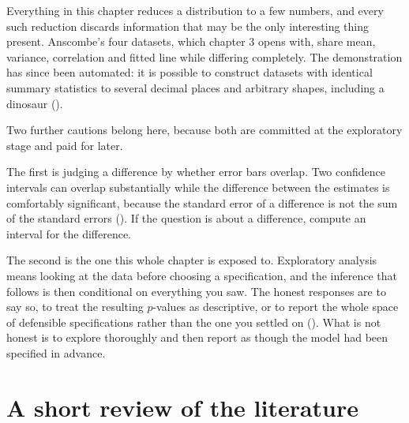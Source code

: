 \documentclass[
  letterpaper,
  10pt,
  twoside,
  openright,
  numbers=noenddot,
  chapterprefix=true]{scrbook}
\begin{document}
Everything in this chapter reduces a distribution to a few numbers, and
every such reduction discards information that may be the only
interesting thing present. Anscombe's four datasets, which chapter 3
opens with, share mean, variance, correlation and fitted line while
differing completely. The demonstration has since been automated: it is
possible to construct datasets with identical summary statistics to
several decimal places and arbitrary shapes, including a dinosaur
().

Two further cautions belong here, because both are committed at the
exploratory stage and paid for later.

The first is judging a difference by whether error bars overlap. Two
confidence intervals can overlap substantially while the difference
between the estimates is comfortably significant, because the standard
error of a difference is not the sum of the standard errors
(). If the
question is about a difference, compute an interval for the difference.

The second is the one this whole chapter is exposed to. Exploratory
analysis means looking at the data before choosing a specification, and
the inference that follows is then conditional on everything you saw.
The honest responses are to say so, to treat the resulting \(p\)-values
as descriptive, or to report the whole space of defensible
specifications rather than the one you settled on
().
What is not honest is to explore thoroughly and then report as though
the model had been specified in advance.

\section{A short review of the
literature}\label{a-short-review-of-the-literature}
\end{document}
